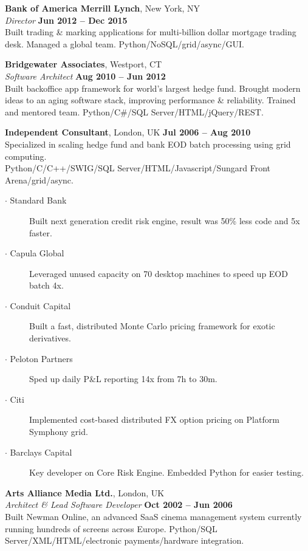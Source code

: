 \documentclass[margin,line]{resume}
\begin{document}
\begin{resume}
    \textbf{Bank of America Merrill Lynch}, New York, NY\\
    \textsl{Director} \hfill \textbf{Jun 2012 -- Dec 2015}\\
    Built trading \& marking applications for multi-billion dollar mortgage trading desk. Managed a 
    global team. Python/NoSQL/grid/async/GUI.
         
    \textbf{Bridgewater Associates}, Westport, CT\\
    \textsl{Software Architect} \hfill \textbf{Aug 2010 -- Jun 2012}\\
    Built backoffice app framework for world's largest hedge fund. Brought modern ideas to an aging software stack, improving
    performance \& reliability. Trained and mentored team. Python/C\#/SQL Server/HTML/jQuery/REST. 

	\textbf{Independent Consultant}, London, UK \hfill \textbf{Jul 2006 -- Aug 2010}\\
    Specialized in scaling hedge fund and bank EOD batch processing using grid computing.\\
    Python/C/C++/SWIG/SQL Server/HTML/Javascript/Sungard Front Arena/grid/async.
    \vspace{0mm}

    \begin{description}
    \item[$\cdot$ Standard Bank] Built next generation credit risk engine, result was 50\% less code and 5x faster. 
    \item[$\cdot$ Capula Global] Leveraged unused capacity on 70 desktop machines to speed up EOD batch 4x.
    \item[$\cdot$ Conduit Capital] Built a fast, distributed Monte Carlo pricing framework for exotic derivatives.
    \item[$\cdot$ Peloton Partners] Sped up daily P\&L reporting 14x from 7h to 30m.
    \item[$\cdot$ Citi] Implemented cost-based distributed FX option pricing on Platform Symphony grid.   
    \item[$\cdot$ Barclays Capital] Key developer on Core Risk Engine. Embedded Python for easier testing.
    \end{description}    

    \textbf{Arts Alliance Media Ltd.}, London, UK\\
    \textsl{Architect \& Lead Software Developer} \hfill \textbf{Oct 2002 -- Jun 2006}\\
	Built Newman Online, an advanced SaaS cinema management system currently running hundreds of screens across Europe.
    Python/SQL Server/XML/HTML/electronic payments/hardware integration.


\end{resume}
\end{document}
